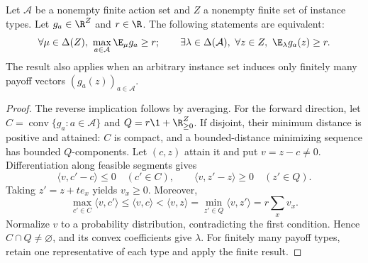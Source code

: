 \begin{lemma}\label{lem:finite-minimax}
Let $\mathcal A$ be a nonempty finite action set and $Z$ a nonempty finite set of instance types. Let $g_a\in\R^Z$ and $r\in\R$. The following statements are equivalent:
\[
 \forall\mu\in\Delta(Z),\ \max_{a\in\mathcal A}\E_\mu g_a\ge r;
 \qquad
 \exists\lambda\in\Delta(\mathcal A),\ \forall z\in Z,\ \E_\lambda g_a(z)\ge r.
\]
The result also applies when an arbitrary instance set induces only finitely many payoff vectors $(g_a(z))_{a\in\mathcal A}$.
\end{lemma}

\begin{proof}
The reverse implication follows by averaging. For the forward direction, let $C=\operatorname{conv}\{g_a:a\in\mathcal A\}$ and $Q=r\1+\R_{\ge0}^Z$. If disjoint, their minimum distance is positive and attained: $C$ is compact, and a bounded-distance minimizing sequence has bounded $Q$-components. Let $(c,z)$ attain it and put $v=z-c\ne0$. Differentiation along feasible segments gives
\[
 \langle v,c'-c\rangle\le0\quad(c'\in C),\qquad
 \langle v,z'-z\rangle\ge0\quad(z'\in Q).
\]
Taking $z'=z+te_x$ yields $v_x\ge0$. Moreover,
\[
 \max_{c'\in C}\langle v,c'\rangle
 \le\langle v,c\rangle<\langle v,z\rangle
 =\min_{z'\in Q}\langle v,z'\rangle=r\sum_xv_x.
\]
Normalize $v$ to a probability distribution, contradicting the first condition. Hence $C\cap Q\ne\varnothing$, and its convex coefficients give $\lambda$. For finitely many payoff types, retain one representative of each type and apply the finite result.
\end{proof}
